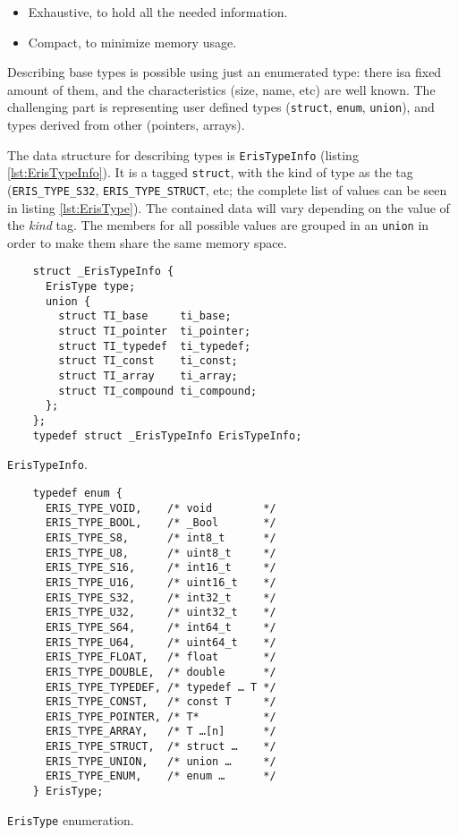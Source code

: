 \begin{itemize}
  \item Exhaustive, to hold all the needed information.
  \item Compact, to minimize memory usage.
\end{itemize}

Describing base types is possible using just an enumerated type: there isa
fixed amount of them, and the characteristics (size, name, etc) are well
known. The challenging part is representing user defined types
(\texttt{struct}, \texttt{enum}, \texttt{union}), and
types derived from other (pointers, arrays).

The data structure for describing types is \verb|ErisTypeInfo| (listing
\vref{lst:ErisTypeInfo}). It is a tagged \texttt{struct}, with the kind
of type as the tag (\verb|ERIS_TYPE_S32|, \verb|ERIS_TYPE_STRUCT|, etc; the
complete list of values can be seen in listing \vref{lst:ErisType}). The
contained data will vary depending on the value of the \emph{kind} tag. The
members for all possible values are grouped in an \texttt{union} in
order to make them share the same memory space.

\begin{listing}[h]
  \begin{verbatim}
    struct _ErisTypeInfo {
      ErisType type;
      union {
        struct TI_base     ti_base;
        struct TI_pointer  ti_pointer;
        struct TI_typedef  ti_typedef;
        struct TI_const    ti_const;
        struct TI_array    ti_array;
        struct TI_compound ti_compound;
      };
    };
    typedef struct _ErisTypeInfo ErisTypeInfo;
  \end{verbatim}
  \caption{\texttt{ErisTypeInfo}.}
  \label{lst:ErisTypeInfo}
\end{listing}

\begin{listing}[f]
  \centering
  \begin{verbatim}
    typedef enum {
      ERIS_TYPE_VOID,    /* void        */
      ERIS_TYPE_BOOL,    /* _Bool       */
      ERIS_TYPE_S8,      /* int8_t      */
      ERIS_TYPE_U8,      /* uint8_t     */
      ERIS_TYPE_S16,     /* int16_t     */
      ERIS_TYPE_U16,     /* uint16_t    */
      ERIS_TYPE_S32,     /* int32_t     */
      ERIS_TYPE_U32,     /* uint32_t    */
      ERIS_TYPE_S64,     /* int64_t     */
      ERIS_TYPE_U64,     /* uint64_t    */
      ERIS_TYPE_FLOAT,   /* float       */
      ERIS_TYPE_DOUBLE,  /* double      */
      ERIS_TYPE_TYPEDEF, /* typedef … T */
      ERIS_TYPE_CONST,   /* const T     */
      ERIS_TYPE_POINTER, /* T*          */
      ERIS_TYPE_ARRAY,   /* T …[n]      */
      ERIS_TYPE_STRUCT,  /* struct …    */
      ERIS_TYPE_UNION,   /* union …     */
      ERIS_TYPE_ENUM,    /* enum …      */
    } ErisType;
  \end{verbatim}
  \caption{\texttt{ErisType} enumeration.}
  \label{lst:ErisType}
\end{listing}

